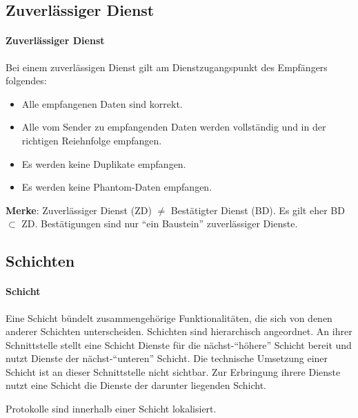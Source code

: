 \documentclass[a4paper, 14pt]{article}
\begin{document}
	\subsection{Zuverlässiger Dienst}

	\paragraph{Zuverlässiger Dienst}

	Bei einem zuverlässigen Dienst gilt am Dienstzugangspunkt des Empfängers folgendes:

	\begin{itemize}
		\item Alle empfangenen Daten sind korrekt.
		\item Alle vom Sender zu empfangenden Daten werden vollständig und in der richtigen Reiehnfolge empfangen.
		\item Es werden keine Duplikate empfangen.
		\item Es werden keine Phantom-Daten empfangen.
	\end{itemize}

	\textbf{Merke}: Zuverlässiger Dienst (ZD) $\neq$ Bestätigter Dienst (BD).
	Es gilt eher BD $\subset$ ZD.
	Bestätigungen sind nur \enquote{ein Baustein} zuverlässiger Dienste.

	\subsection{Schichten}

	\paragraph{Schicht}

	Eine Schicht bündelt zusammengehörige Funktionalitäten, die sich von denen anderer Schichten unterscheiden.
	Schichten sind hierarchisch angeordnet.
	An ihrer Schnittstelle stellt eine Schicht Dienste für die nächst-\enquote{höhere} Schicht bereit und nutzt Dienste der nächst-\enquote{unteren} Schicht.
	Die technische Umsetzung einer Schicht ist an dieser Schnittstelle nicht sichtbar.
	Zur Erbringung ihrere Dienste nutzt eine Schicht die Dienste der darunter liegenden Schicht.

	Protokolle sind innerhalb einer Schicht lokalisiert.
\end{document}
